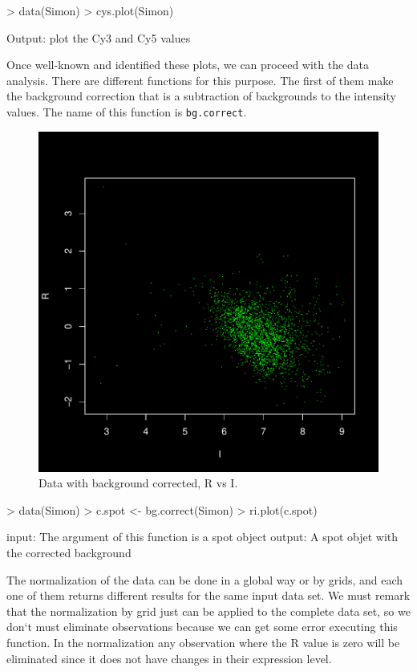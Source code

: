\documentclass[12pt]{article}
\begin{document}
\begin{Scode}
> data(Simon)
> cys.plot(Simon)
\end{Scode}
\begin{Soutput}
Output: plot the Cy3 and Cy5 values
\end{Soutput}
\pagebreak
Once well-known and identified these plots, we can proceed with the data analysis. There are different functions for this purpose. The first of them make the background correction that is a subtraction of backgrounds to the intensity values. The name of this function is \texttt{bg.correct}.
\begin{figure}[h]
\begin{center}
\includegraphics{example-genArise-009}
\caption{Data with background corrected, R vs I. \label{fig7}}
\end{center}
\end{figure}
\begin{Scode}
> data(Simon)
> c.spot <- bg.correct(Simon)
> ri.plot(c.spot)
\end{Scode}

\begin{Soutput}
input: The argument of this function is a spot object
output: A spot objet with the corrected background
\end{Soutput}

The normalization of the data can be done in a global way or by grids, and each one of them returns different results for the same input data set. We must remark that the normalization by grid just can be applied to the complete data set, so we don`t must eliminate observations because we can get some error executing this function.  In the normalization any observation where the R value is zero will be eliminated since it does not have changes in their expression level.\\
\end{document}
